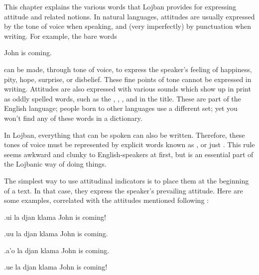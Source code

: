 This chapter explains the various words that Lojban provides
    for expressing attitude and related notions. In natural
    languages, attitudes are usually expressed by the tone of voice
    when speaking, and (very imperfectly) by punctuation when
    writing. For example, the bare words
\begin{example}
John is coming.
\end{example}

{\noindent}can be made, through tone of voice, to express the speaker's
    feeling of happiness, pity, hope, surprise, or disbelief. These
    fine points of tone cannot be expressed in writing. Attitudes
    are also expressed with various sounds which show up in print
    as oddly spelled words, such as the , ,
    , and  in the title. These are part of the
    English language; people born to other languages use a
    different set; yet you won't find any of these words in a
    dictionary. 

In Lojban, everything that can be spoken can also be
    written. Therefore, these tones of voice must be represented by
    explicit words known as , or just
    . This rule seems awkward and clunky to
    English-speakers at first, but is an essential part of the
    Lojbanic way of doing things.

The simplest way to use attitudinal indicators is to place
    them at the beginning of a text. In that case, they express the
    speaker's prevailing attitude. Here are some examples,
    correlated with the attitudes mentioned following :
\begin{example}
.ui la djan klama\n
{} John is coming!
\end{example}

\begin{example}
.uu la djan klama\n
{} John is coming.
\end{example}

\begin{example}
.a'o la djan klama\n
{} John is coming.
\end{example}

\begin{example}
.ue la djan klama\n
{} John is coming!
\end{example}

